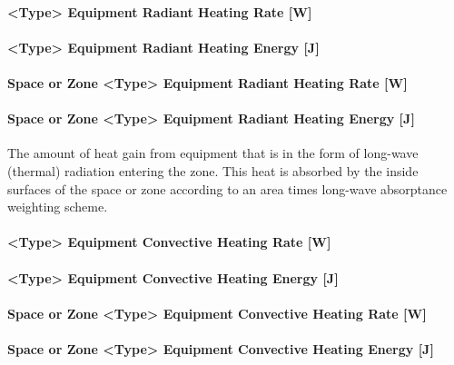 \paragraph{<Type> Equipment Radiant Heating Rate {[}W{]}}\label{equipment-radiant-heating-rate-w}

\paragraph{<Type> Equipment Radiant Heating Energy {[}J{]}}\label{equipment-radiant-heating-energy-j}

\paragraph{Space or Zone <Type> Equipment Radiant Heating Rate {[}W{]}}\label{zone-equipment-radiant-heating-rate-w}

\paragraph{Space or Zone <Type> Equipment Radiant Heating Energy {[}J{]}}\label{zone-equipment-radiant-heating-energy-j}

The amount of heat gain from equipment that is in the form of long-wave (thermal) radiation entering the zone. This heat is absorbed by the inside surfaces of the space or zone according to an area times long-wave absorptance weighting scheme.

\paragraph{<Type> Equipment Convective Heating Rate {[}W{]}}\label{equipment-convective-heating-rate-w}

\paragraph{<Type> Equipment Convective Heating Energy {[}J{]}}\label{equipment-convective-heating-energy-j}

\paragraph{Space or Zone <Type> Equipment Convective Heating Rate {[}W{]}}\label{zone-equipment-convective-heating-rate-w}

\paragraph{Space or Zone <Type> Equipment Convective Heating Energy {[}J{]}}\label{zone-equipment-convective-heating-energy-j}


